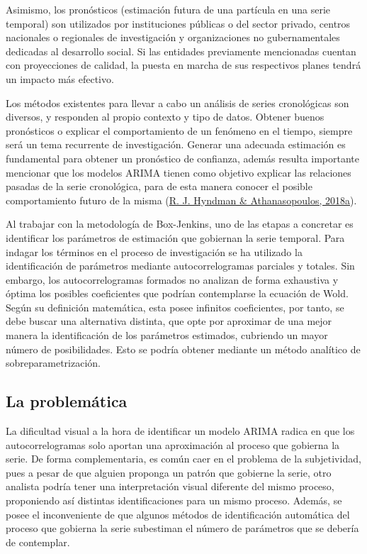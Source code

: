 \documentclass[
]{article}
\begin{document}
Asimismo, los pronósticos (estimación futura de una partícula en una
serie temporal) son utilizados por instituciones públicas o del sector
privado, centros nacionales o regionales de investigación y
organizaciones no gubernamentales dedicadas al desarrollo social. Si las
entidades previamente mencionadas cuentan con proyecciones de calidad,
la puesta en marcha de sus respectivos planes tendrá un impacto más
efectivo.

Los métodos existentes para llevar a cabo un análisis de series
cronológicas son diversos, y responden al propio contexto y tipo de
datos. Obtener buenos pronósticos o explicar el comportamiento de un
fenómeno en el tiempo, siempre será un tema recurrente de investigación.
Generar una adecuada estimación es fundamental para obtener un
pronóstico de confianza, además resulta importante mencionar que los
modelos ARIMA tienen como objetivo explicar las relaciones pasadas de la
serie cronológica, para de esta manera conocer el posible comportamiento
futuro de la misma (\protect\hyperlink{ref-hyndman2018forecasting}{R. J.
Hyndman \& Athanasopoulos, 2018a}).

Al trabajar con la metodología de Box-Jenkins, uno de las etapas a
concretar es identificar los parámetros de estimación que gobiernan la
serie temporal. Para indagar los términos en el proceso de investigación
se ha utilizado la identificación de parámetros mediante
autocorrelogramas parciales y totales. Sin embargo, los
autocorrelogramas formados no analizan de forma exhaustiva y óptima los
posibles coeficientes que podrían contemplarse la ecuación de Wold.
Según su definición matemática, esta posee infinitos coeficientes, por
tanto, se debe buscar una alternativa distinta, que opte por aproximar
de una mejor manera la identificación de los parámetros estimados,
cubriendo un mayor número de posibilidades. Esto se podría obtener
mediante un método analítico de sobreparametrización.

\subsection{La problemática}

La dificultad visual a la hora de identificar un modelo ARIMA radica en
que los autocorrelogramas solo aportan una aproximación al proceso que
gobierna la serie. De forma complementaria, es común caer en el problema
de la subjetividad, pues a pesar de que alguien proponga un patrón que
gobierne la serie, otro analista podría tener una interpretación visual
diferente del mismo proceso, proponiendo así distintas identificaciones
para un mismo proceso. Además, se posee el inconveniente de que algunos
métodos de identificación automática del proceso que gobierna la serie
subestiman el número de parámetros que se debería de contemplar.
\end{document}
